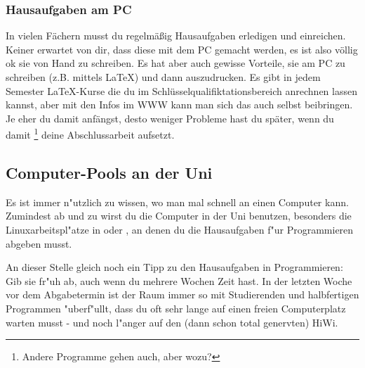 \subsubsection{Hausaufgaben am PC}
In vielen Fächern musst du regelmäßig Hausaufgaben erledigen und einreichen.
Keiner erwartet von dir, dass diese mit dem PC gemacht werden, es ist also
völlig ok sie von Hand zu schreiben. Es hat aber auch gewisse Vorteile, sie
am PC zu schreiben (z.B. mittels \LaTeX) und dann auszudrucken. Es gibt in
jedem Semester \LaTeX-Kurse die du im Schlüsselqualifiktationsbereich 
anrechnen lassen kannst, aber mit den Infos im WWW kann man sich das auch
selbst beibringen. Je eher du damit anfängst, desto weniger Probleme hast
du später, wenn du damit \footnote{Andere Programme gehen auch, aber
  wozu?} deine Abschlussarbeit aufsetzt.

\subsection{Computer-Pools an der Uni}
Es ist immer n"utzlich zu wissen, wo man mal schnell an einen Computer kann.
Zumindest ab und zu wirst du die Computer in der Uni benutzen, besonders
die Linuxarbeitspl"atze in  oder , an denen du die Hausaufgaben f"ur
Programmieren abgeben musst.

{\small
An dieser Stelle gleich noch ein Tipp zu den Hausaufgaben in Programmieren:
Gib sie fr"uh ab, auch wenn du mehrere Wochen Zeit hast. In der letzten Woche
vor dem Abgabetermin ist der Raum immer so mit Studierenden und halbfertigen
Programmen "uberf"ullt, dass du oft sehr lange auf einen freien Computerplatz
warten musst - und noch l"anger auf den (dann schon total genervten) HiWi.
}

